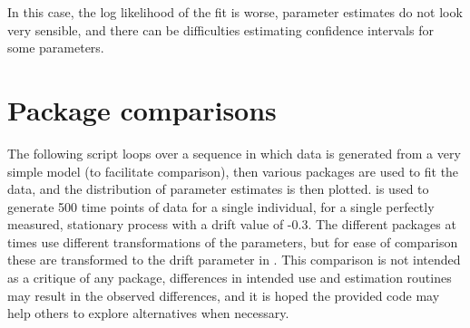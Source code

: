 \documentclass[nojss]{jss}\usepackage[]{graphicx}\usepackage[]{color}
\begin{document}
In this case, the log likelihood of the fit is worse, parameter estimates do not look very sensible, and there can be difficulties estimating confidence intervals for some parameters.

\newpage
\section{Package comparisons} \label{app:appendixA}\nopagebreak
The following script loops over a sequence in which data is generated from a very simple model (to facilitate comparison), then various packages are used to fit the data, and the distribution of parameter estimates is then plotted.  is used to generate 500 time points of data for a single individual, for a single perfectly measured, stationary process with a drift value of -0.3. The different packages at times use different transformations of the parameters, but for ease of comparison these are transformed to the drift parameter in . This comparison is not intended as a critique of any package, differences in intended use and estimation routines may result in the observed differences, and it is hoped the provided code  may help others to explore alternatives when necessary.
\end{document}
